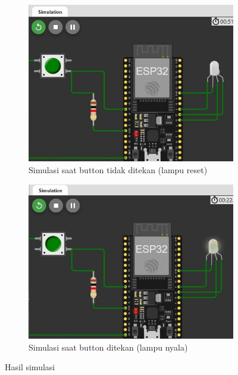 \begin{enumerate}
  \begin{figure}[H]
    \centering
    \begin{subfigure}[c]{0.46\linewidth}
      \centering
      \includegraphics[width=\linewidth]{img/modul_4/tupen_lampu_mati.jpg}
      \caption{Simulasi saat button tidak ditekan (lampu reset) \label{fig:inisub1}}
    \end{subfigure}
    \hspace{1cm}
    \begin{subfigure}[c]{0.46\linewidth}
      \centering
      \includegraphics[width=\linewidth]{img/modul_4/tupen_lampu_nyala.jpg}
      \caption{Simulasi saat button ditekan (lampu nyala) \label{fig:inisub2}}
    \end{subfigure}
    \caption{Hasil simulasi \label{fig:keduagambar}}
  \end{figure}
\end{enumerate}
  

